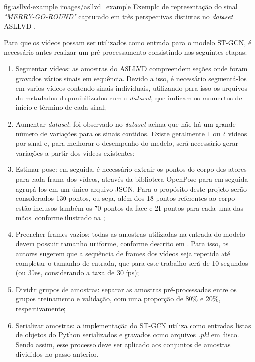 \image
    {fig:asllvd-example}
    {images/asllvd_example}
    {Exemplo de representação do sinal \textit{"MERRY-GO-ROUND"} capturado em três perspectivas distintas no \textit{dataset} ASLLVD \cite{athitsos-asldataset-2008}.}

Para que os vídeos possam ser utilizados como entrada para o modelo ST-GCN, é necessário antes realizar um pré-processamento consistindo nas seguintes etapas:
\begin{enumerate}
    \item Segmentar vídeos: as amostras do  ASLLVD compreendem seções onde foram gravados vários sinais em sequência. Devido a isso, é necessário segmentá-los em vários vídeos contendo sinais individuais, utilizando para isso os arquivos de metadados disponibilizados com o \textit{dataset}, que indicam os momentos de início e término de cada sinal;
    \item Aumentar \textit{dataset}: foi observado no \textit{dataset} acima que não há um grande número de variações para os sinais contidos. Existe geralmente 1 ou 2 vídeos por sinal e, para melhorar o desempenho do modelo, será necessário gerar variações a partir dos vídeos existentes;
    \item Estimar pose: em seguida, é necessário extrair os pontos do corpo dos atores para cada frame dos vídeos, através da biblioteca OpenPose para em seguida agrupá-los em um único arquivo JSON. Para o propósito deste projeto serão considerados 130 pontos, ou seja, além dos 18 pontos referentes ao corpo estão inclusos também os 70 pontos da face e 21 pontos para cada uma das mãos, conforme ilustrado na ;
    \item Preencher frames vazios: todas as amostras utilizadas na entrada do modelo devem possuir tamanho uniforme, conforme descrito em \cite{st-gcn-2018}. Para isso, os autores sugerem que a sequência de frames dos vídeos seja repetida até completar o tamanho de entrada, que para este trabalho será de 10 segundos (ou 30es, considerando a taxa de 30 fps);
    \item Dividir grupos de amostras: separar as amostras pré-processadas entre os grupos treinamento e validação, com uma proporção de 80\% e 20\%, respectivamente;
    \item Serializar amostras: a implementação do ST-GCN utiliza como entradas listas de objetos do Python serializados e gravados como arquivos \textit{.pkl} em disco. Sendo assim, esse processo deve ser aplicado aos conjuntos de amostras divididos no passo anterior.
\end{enumerate}

